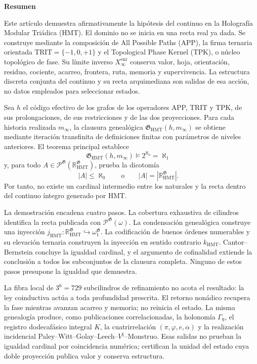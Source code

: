 \begingroup
\begin{center}\textbf{Resumen}\end{center}
\fontsize{9.1}{10.55}\selectfont
\setlength{\parskip}{1.2pt}
\setlength{\abovedisplayskip}{3pt}
\setlength{\belowdisplayskip}{3pt}
Este artículo demuestra afirmativamente la hipótesis del continuo en la
Holografía Modular Triádica (HMT). El dominio no se inicia en una recta real
ya dada. Se construye mediante la composición de All Possible Paths (APP), la
firma ternaria orientada
\(\mathrm{TRIT}=\{-1,0,+1\}\) y el Topological Phase Kernel (TPK), o núcleo
topológico de fase. Su límite inverso
\(X_\infty^{\mathrm{enr}}\) conserva valor, hoja, orientación, residuo,
cociente, acarreo, frontera, ruta, memoria y supervivencia. La estructura
discreta conjunta del continuo y su recta arquimediana son salidas de esa
acción, no datos empleados para seleccionar estados.

Sea \(h\) el código efectivo de los grafos de los operadores APP, TRIT y TPK,
de sus prolongaciones, de sus restricciones y de las dos proyecciones. Para
cada historia realizada \(m_\infty\), la clausura genealógica
\(\mathfrak G_{\mathrm{HMT}}(h,m_\infty)\) se obtiene mediante iteración
transfinita de definiciones finitas con parámetros de niveles anteriores. El
teorema principal establece
\[
 \boxed{\mathfrak G_{\mathrm{HMT}}(h,m_\infty)
 \models 2^{\aleph_0}=\aleph_1}
\]
y, para todo
\(A\in\mathcal P^{\mathfrak G}
(\mathbb R_{\mathrm{HMT}}^{\mathfrak G})\), prueba la dicotomía
\[
 |A|\leq\aleph_0
 \qquad\text{o}\qquad
 |A|=|\mathbb R_{\mathrm{HMT}}^{\mathfrak G}|.
\]
Por tanto, no existe un cardinal intermedio entre los naturales y la recta
dentro del continuo íntegro generado por HMT.

La demostración encadena cuatro pasos. La cobertura exhaustiva de cilindros
identifica la recta publicada con
\(\mathcal P^{\mathfrak G}(\omega)\). La condensación genealógica construye
una inyección
\(j_{\mathrm{HMT}}:\mathbb R_{\mathrm{HMT}}^{\mathfrak G}
\hookrightarrow\omega_1^{\mathfrak G}\). La codificación de buenos órdenes
numerables y su elevación ternaria construyen la inyección en sentido contrario
\(k_{\mathrm{HMT}}\). Cantor--Bernstein concluye la igualdad cardinal, y el
argumento de cofinalidad extiende la conclusión a todos los subconjuntos de la
clausura completa. Ninguno de estos pasos presupone la igualdad que demuestra.

La fibra local de \(3^6=729\) subcilindros de refinamiento no acota el
resultado: la ley coinductiva actúa a toda profundidad prescrita. El retorno
nonádico recupera la fase mientras avanzan acarreo y memoria; no reinicia el
estado. La misma genealogía produce, como publicaciones correlacionadas, la
holonomía \(\Gamma_9\), el registro dodecafásico integral \(K\), la
cuatrirrelación \((\pi,\varphi,e,\alpha)\) y la realización incidencial
Paley--Witt--Golay--Leech--\(V^\natural\)--Monstruo. Esas salidas no prueban
la igualdad cardinal por coincidencia numérica; certifican la unidad del
estado cuya doble proyección publica valor y conserva estructura.

